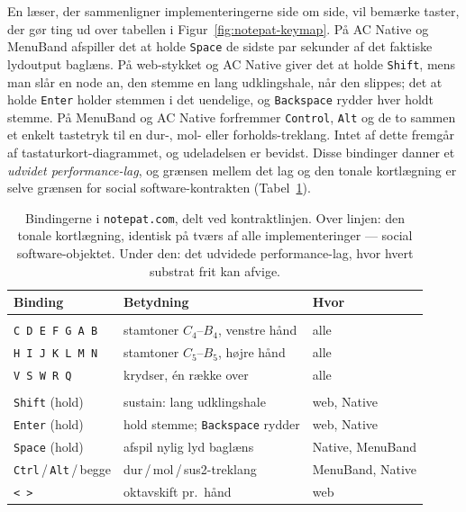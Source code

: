 \documentclass[10pt,letterpaper,twocolumn]{article}
\begin{document}
En læser, der sammenligner implementeringerne side om side, vil bemærke taster, der gør ting ud over tabellen i Figur~\ref{fig:notepat-keymap}. På AC Native og MenuBand afspiller det at holde \texttt{Space} de sidste par sekunder af det faktiske lydoutput baglæns. På web-stykket og AC Native giver det at holde \texttt{Shift}, mens man slår en node an, den stemme en lang udklingshale, når den slippes; det at holde \texttt{Enter} holder stemmen i det uendelige, og \texttt{Backspace} rydder hver holdt stemme. På MenuBand og AC Native forfremmer \texttt{Control}, \texttt{Alt} og de to sammen et enkelt tastetryk til en dur-, mol- eller forholds-treklang. Intet af dette fremgår af tastaturkort-diagrammet, og udeladelsen er bevidst. Disse bindinger danner et \emph{udvidet performance-lag}, og grænsen mellem det lag og den tonale kortlægning er selve grænsen for social software-kontrakten (Tabel~\ref{tab:contract-line}).

\begin{table}[t]
\footnotesize
\setlength{\tabcolsep}{3pt}
\renewcommand{\arraystretch}{1.05}
\centering
\caption{Bindingerne i \texttt{notepat.com}, delt ved kontraktlinjen. Over linjen: den tonale kortlægning, identisk på tværs af alle implementeringer --- social software-objektet. Under den: det udvidede performance-lag, hvor hvert substrat frit kan afvige.}
\label{tab:contract-line}
\begin{tabularx}{\columnwidth}{@{}>{\RaggedRight}p{}>{\RaggedRight}X>{\RaggedRight\arraybackslash}p{}@{}}
\toprule
\textbf{Binding} & \textbf{Betydning} & \textbf{Hvor} \\
\midrule
\multicolumn{3}{@{}l}{\emph{Tonal kontrakt}} \\[0.1em]
\texttt{C D E F G A B} & stamtoner $C_4$--$B_4$, venstre hånd & alle \\
\texttt{H I J K L M N} & stamtoner $C_5$--$B_5$, højre hånd & alle \\
\texttt{V S W R Q} & krydser, én række over & alle \\
\midrule
\multicolumn{3}{@{}l}{\emph{Udvidet performance-lag}} \\[0.1em]
\texttt{Shift} (hold) & sustain: lang udklingshale & web, Native \\
\texttt{Enter} (hold) & hold stemme; \texttt{Backspace} rydder & web, Native \\
\texttt{Space} (hold) & afspil nylig lyd baglæns & Native, MenuBand \\
\texttt{Ctrl}\,/\,\texttt{Alt}\,/\,begge & dur\,/\,mol\,/\,sus2-treklang & MenuBand, Native \\
\texttt{<}~\texttt{>} & oktavskift pr.\ hånd & web \\
\bottomrule
\end{tabularx}
\end{table}
\end{document}

